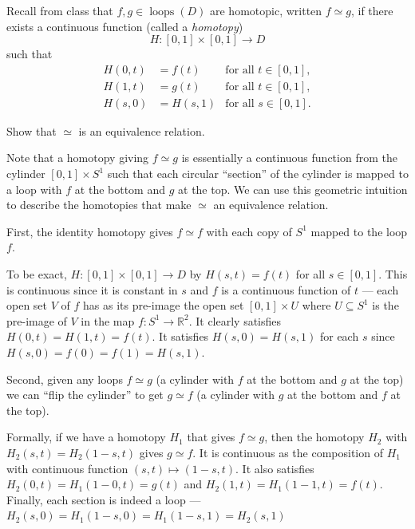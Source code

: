 \documentclass[12 pt, letterpaper]{hmcpset}
\begin{document}
\begin{problem}[10.]
	Recall from class that $f, g \in \operatorname{loops}(D)$ are homotopic, written $f \simeq g$, if there exists a continuous function (called a \emph{homotopy})
	\[
		H : [0, 1] \times [0, 1] \to D
	\]
	such that
	\begin{align*}
		H(0,t) & = f(t) & \text{for all $t \in [0,1]$}, \\
		H(1,t) & = g(t) & \text{for all $t \in [0,1]$}, \\
		H(s,0) & = H(s,1) & \text{for all $s \in [0,1]$}.
	\end{align*}

	Show that $\simeq$ is an equivalence relation.
\end{problem}

\begin{solution}
	Note that a homotopy giving $f \simeq g$ is essentially a continuous function from the cylinder $[0, 1] \times S^{1}$ such that each circular ``section'' of the cylinder is mapped to a loop with $f$ at the bottom and $g$ at the top. We can use this geometric intuition to describe the homotopies that make $\simeq$ an equivalence relation.

	First, the identity homotopy gives $f \simeq f$ with each copy of $S^{1}$ mapped to the loop $f$.

	To be exact, $H : [0, 1] \times [0, 1] \to D$ by $H(s, t) = f(t)$ for all $s \in [0, 1]$. This is continuous since it is constant in $s$ and $f$ is a continuous function of $t$ --- each open set $V$ of $f$ has as its pre-image the open set $[0, 1] \times U$ where $U \subseteq S^{1}$ is the pre-image of $V$ in the map $f : S^{1} \to \mathbb{R}^{2}$. It clearly satisfies $H(0, t) = H(1, t) = f(t)$. It satisfies $H(s, 0) = H(s, 1)$ for each $s$ since $H(s, 0) = f(0) = f(1) = H(s, 1)$.

	Second, given any loops $f \simeq g$ (a cylinder with $f$ at the bottom and $g$ at the top) we can ``flip the cylinder'' to get $g \simeq f$ (a cylinder with $g$ at the bottom and $f$ at the top).

	Formally, if we have a homotopy $H_{1}$ that gives $f \simeq g$, then the homotopy $H_{2}$ with $H_{2}(s, t) = H_{2}(1 - s, t)$ gives $g \simeq f$. It is continuous as the composition of $H_{1}$ with continuous function $(s, t) \mapsto (1 - s, t)$. It also satisfies $H_{2}(0, t) = H_{1}(1 - 0, t) = g(t)$ and $H_{2}(1, t) = H_{1}(1 - 1, t) = f(t)$. Finally, each section is indeed a loop --- $H_{2}(s, 0) = H_{1}(1 - s, 0) = H_{1}(1 - s, 1) = H_{2}(s, 1)$


\end{solution}
\end{document}
